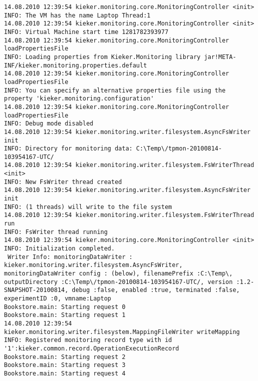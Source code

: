 \setTextListing
\begin{lstlisting}[caption=Execution of the manually instrumented Bookstore application (Section~\ref{sec:example:monitoring})]
14.08.2010 12:39:54 kieker.monitoring.core.MonitoringController <init>
INFO: The VM has the name Laptop Thread:1
14.08.2010 12:39:54 kieker.monitoring.core.MonitoringController <init>
INFO: Virtual Machine start time 1281782393977
14.08.2010 12:39:54 kieker.monitoring.core.MonitoringController loadPropertiesFile
INFO: Loading properties from Kieker.Monitoring library jar!META-INF/kieker.monitoring.properties.default
14.08.2010 12:39:54 kieker.monitoring.core.MonitoringController loadPropertiesFile
INFO: You can specify an alternative properties file using the property 'kieker.monitoring.configuration'
14.08.2010 12:39:54 kieker.monitoring.core.MonitoringController loadPropertiesFile
INFO: Debug mode disabled
14.08.2010 12:39:54 kieker.monitoring.writer.filesystem.AsyncFsWriter init
INFO: Directory for monitoring data: C:\Temp\/tpmon-20100814-103954167-UTC/
14.08.2010 12:39:54 kieker.monitoring.writer.filesystem.FsWriterThread <init>
INFO: New FsWriter thread created
14.08.2010 12:39:54 kieker.monitoring.writer.filesystem.AsyncFsWriter init
INFO: (1 threads) will write to the file system
14.08.2010 12:39:54 kieker.monitoring.writer.filesystem.FsWriterThread run
INFO: FsWriter thread running
14.08.2010 12:39:54 kieker.monitoring.core.MonitoringController <init>
INFO: Initialization completed.
 Writer Info: monitoringDataWriter : kieker.monitoring.writer.filesystem.AsyncFsWriter, monitoringDataWriter config : (below), filenamePrefix :C:\Temp\, outputDirectory :C:\Temp\/tpmon-20100814-103954167-UTC/, version :1.2-SNAPSHOT-20100814, debug :false, enabled :true, terminated :false, experimentID :0, vmname:Laptop
Bookstore.main: Starting request 0
Bookstore.main: Starting request 1
14.08.2010 12:39:54 kieker.monitoring.writer.filesystem.MappingFileWriter writeMapping
INFO: Registered monitoring record type with id '1':kieker.common.record.OperationExecutionRecord
Bookstore.main: Starting request 2
Bookstore.main: Starting request 3
Bookstore.main: Starting request 4
\end{lstlisting}